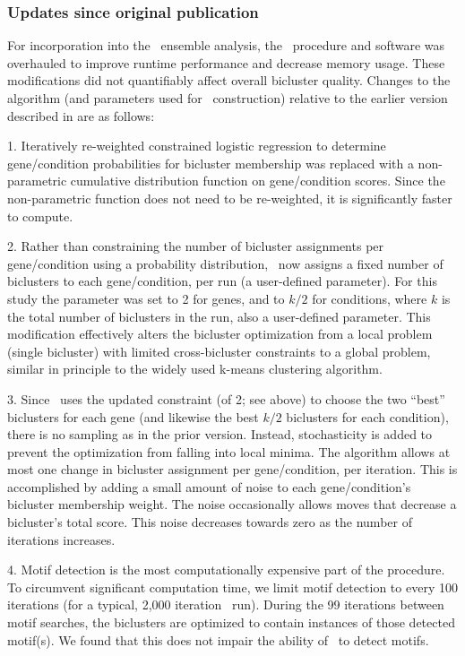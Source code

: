 \subsubsection{Updates since original publication}

For incorporation into the \egrine~ensemble analysis, the \cm\
procedure and software was overhauled to improve runtime performance
and decrease memory usage. These modifications did not quantifiably
affect overall bicluster quality. Changes to the algorithm (and
parameters used for \egrine~construction) relative to the earlier
version described in \cite{Reiss2006n} are as follows:

1. Iteratively re-weighted constrained logistic regression
to determine gene/condition probabilities for bicluster membership was
replaced with a non-parametric cumulative distribution function on
gene/condition scores. Since the non-parametric function does not need
to be re-weighted, it is significantly faster to compute.

2. Rather than constraining the number of bicluster assignments per
gene/condition using a probability distribution, \cm\ now assigns a
fixed number of biclusters to each gene/condition, per run (a
user-defined parameter). For this study the parameter was set to 2 for genes, and
to $k/2$ for conditions, where $k$ is the total number of biclusters in
the run, also a user-defined parameter. This modification effectively
alters the bicluster optimization from a local
problem (single bicluster) with limited cross-bicluster constraints to a global problem,
similar in principle to the widely used k-means clustering algorithm.

3. Since \cm\ uses the updated constraint (of 2; see above) to choose
the two ``best'' biclusters for each gene (and likewise the best $k/2$
biclusters for each condition), there is no sampling as in the prior
version. Instead, stochasticity is added to prevent the optimization
from falling into local minima. The algorithm allows at most one
change in bicluster assignment per gene/condition, per iteration. This
is accomplished by adding a small amount of noise to each
gene/condition's bicluster membership weight. The noise occasionally
allows moves that decrease a bicluster's total score. This noise
decreases towards zero as the number of iterations increases.

4. Motif detection is the most computationally expensive part of the
procedure. To circumvent significant computation time, we limit motif 
detection to every 100 iterations (for a typical,
2,000 iteration \cm\ run). During the 99 iterations between motif
searches, the biclusters are optimized to contain instances of those
detected motif(s). We found that this does not impair the ability of
\cm\ to detect motifs.

